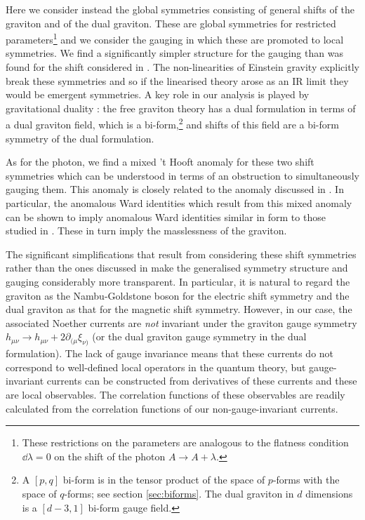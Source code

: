 Here we consider instead the global symmetries consisting of general shifts of the graviton and of the dual graviton.
These are global symmetries for restricted parameters\footnote{These restrictions on the parameters are analogous to the flatness condition $\dd\lambda=0$ on the shift of the photon $A\to A+\lambda$.}
and we consider the gauging in which these are promoted to local symmetries.
We find a significantly simpler structure for the gauging than was found for the shift considered in \cite{Hinterbichler2023GravitySymmetries}.
The non-linearities of Einstein gravity explicitly break these symmetries and so if the linearised theory arose as an IR limit \cite{Farnsworth:2021zgj} they would be emergent symmetries.
A key role in our analysis is played by gravitational duality \cite{Hull2000}: the free graviton theory has a dual formulation in terms of a dual graviton field, which is a bi-form,\footnote{A $[p,q]$ bi-form is in the tensor product of the space of $p$-forms with the space of $q$-forms; see section \ref{sec:biforms}. The dual graviton in $d$ dimensions is a $[d-3,1]$ bi-form gauge field.} and shifts of this field are a bi-form symmetry of the dual formulation.

As for the photon, we find  a mixed 't Hooft anomaly for these two shift symmetries which can be understood in terms of an obstruction to simultaneously gauging them.
This anomaly is closely related to the anomaly discussed in \cite{Hinterbichler2023GravitySymmetries}. In particular, the anomalous Ward identities which result from this mixed anomaly can be shown to imply anomalous Ward identities similar in form to those studied in \cite{Hinterbichler2023GravitySymmetries}. These in turn imply the masslessness of the graviton.

The significant simplifications that result from considering these shift symmetries rather than the ones discussed in \cite{Hinterbichler2023GravitySymmetries} make the generalised symmetry structure and gauging considerably more transparent. In particular, it is natural to regard the graviton as the Nambu-Goldstone boson for the electric shift symmetry and the dual graviton as that for the magnetic shift symmetry.
However, in our case, the associated Noether currents are \emph{not} invariant under the graviton gauge symmetry $h_{\mu\nu} \to h_{\mu\nu} + 2\partial_{(\mu} \xi_{\nu)}$ (or the dual graviton gauge symmetry in the dual formulation).
The lack of gauge invariance means that these currents do not correspond to  well-defined local operators in the quantum theory, but gauge-invariant currents can be constructed from derivatives of these currents and these are local observables.
The correlation functions of these observables are readily calculated from the correlation functions of our non-gauge-invariant currents. 

